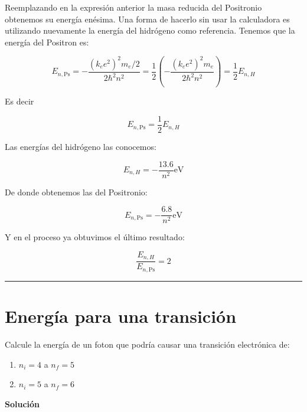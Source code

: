 \documentclass[12pt]{article}
\begin{document}
Reemplazando en la expresión anterior la masa reducida del Positronio obtenemos su energía enésima. Una forma de hacerlo sin usar la calculadora es utilizando nuevamente la energía del hidrógeno como referencia. Tenemos que la energía del Positron es:

\begin{equation*}
E_{n,\text{Ps}} = -\frac{(k_e e^2)^2 m_e/2 }{2 \hbar^2 n^2}  =  \frac{1}{2} \left(-\frac{(k_e e^2)^2 m_e }{2 \hbar^2 n^2}\right) =  \frac{1}{2}E_{n,H} 
\end{equation*}

Es decir

\begin{equation*}
E_{n,\text{Ps}} =\frac{1}{2}E_{n,H} 
\end{equation*}

Las energías del hidrógeno las conocemos:



\begin{equation*}
E_{n,H} =- \frac{13.6}{n^2}\text{eV}
\end{equation*}

De donde obtenemos las del Positronio:

\begin{equation*}
E_{n,\text{Ps}} =  - \frac{6.8 }{n^2} \text{eV}
\end{equation*}


Y en el proceso ya obtuvimos el último resultado:


\begin{equation*}
\frac{E_{n,H}}{E_{n,\text{Ps}}}  =2
\end{equation*}

\noindent\rule{16.5cm}{0.4pt}

\section{Energía para una transición}

Calcule la energía de un foton que podría causar una transición electrónica de:


\begin{enumerate}[label=\alph*)]
	\item $n_i = 4$ a $n_f = 5$ 
	\item $n_i = 5$ a $n_f = 6$
\end{enumerate}


\begin{center}
	\textbf{Solución}
\end{center}
\end{document}
